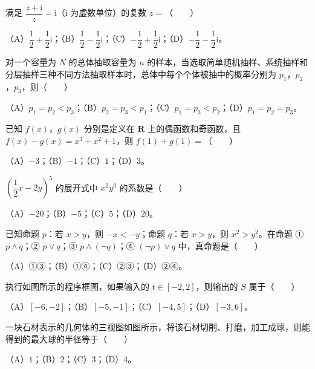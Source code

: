 \begin{question}
满足 $\dfrac{z+\mathrm i}{z}=\mathrm i$（$\mathrm i$ 为虚数单位）的复数 $z=$\mbox{（　　）}

（A）$\dfrac12+\dfrac12\mathrm i$；（B）$\dfrac12-\dfrac12\mathrm i$；（C）$-\dfrac12+\dfrac12\mathrm i$；（D）$-\dfrac12-\dfrac12\mathrm i$。

\end{question}
\begin{question}
对一个容量为 $N$ 的总体抽取容量为 $n$ 的样本，当选取简单随机抽样、系统抽样和分层抽样三种不同方法抽取样本时，总体中每个个体被抽中的概率分别为 $p_1$，$p_2$，$p_3$，则\mbox{（　　）}

（A）$p_1=p_2<p_3$；（B）$p_2=p_3<p_1$；（C）$p_1=p_3<p_2$；（D）$p_1=p_2=p_3$。

\end{question}
\begin{question}
已知 $f(x)$，$g(x)$ 分别是定义在 $\mathbf R$ 上的偶函数和奇函数，且 $f(x)-g(x)=x^3+x^2+1$，则 $f(1)+g(1)=$\mbox{（　　）}

（A）$-3$；（B）$-1$；（C）$1$；（D）$3$。

\end{question}
\begin{question}
$\left(\dfrac12x-2y\right)^5$ 的展开式中 $x^2y^3$ 的系数是\mbox{（　　）}

（A）$-20$；（B）$-5$；（C）$5$；（D）$20$。

\end{question}
\begin{question}
已知命题 $p$：若 $x>y$，则 $-x<-y$；命题 $q$：若 $x>y$，则 $x^2>y^2$。在命题 ① $p\wedge q$；② $p\vee q$；③ $p\wedge(\neg q)$；④ $(\neg p)\vee q$ 中，真命题是\mbox{（　　）}

（A）①③；（B）①④；（C）②③；（D）②④。

\Needspace{0.4\textheight}
\end{question}
\begin{question}
执行如图所示的程序框图，如果输入的 $t\in[-2,2]$，则输出的 $S$ 属于\mbox{（　　）}
\nopagebreak[4]
\begin{center}\end{center}
\nopagebreak[4]
（A）$[-6,-2]$；（B）$[-5,-1]$；（C）$[-4,5]$；（D）$[-3,6]$。

\Needspace{0.4\textheight}
\end{question}
\begin{question}
一块石材表示的几何体的三视图如图所示，将该石材切削、打磨，加工成球，则能得到的最大球的半径等于\mbox{（　　）}
\nopagebreak[4]
\begin{center}\end{center}
\nopagebreak[4]
（A）$1$；（B）$2$；（C）$3$；（D）$4$。

\end{question}
